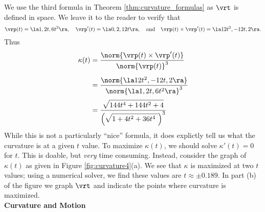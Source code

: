 {We use the third formula in Theorem \ref{thm:curvature_formulas} as $\vrt$ is defined in space. We leave it to the reader to verify that 
$$\vrp(t) =\la 1,2t,6t^2\ra,\quad \vrp'(t) = \la 0,2,12t\ra,\quad \text{and}\quad \vrp(t)\times \vrp'(t) = \la 12t^2,-12t,2\ra.$$
Thus 
\begin{align*}
\kappa(t) &= \frac{\norm{\vrp(t)\times\vrp'(t)}}{\norm{\vrp(t)}^3} \\
				&= \rule{0pt}{20pt}\frac{\norm{\la 12t^2,-12t,2\ra}}{\norm{\la 1,2t,6t^2\ra}^3} \\
				&= \rule{0pt}{20pt}\frac{\sqrt{\rule{0pt}{8.5pt}144t^4+144t^2+4}}{\left(\sqrt{\rule{0pt}{8.5pt}1+4t^2+36t^4\ }\right)^3}
\end{align*}
While this is not a particularly ``nice'' formula, it does explictly tell us what the curvature is at a given $t$ value. To maximize $\kappa(t)$, we should solve $\kappa'(t)=0$ for $t$. This is doable, but \emph{very} time consuming. Instead, consider the graph of $\kappa(t)$ as given in Figure \ref{fig:curvature4}(a). We see that $\kappa$ is maximized at two $t$ values; using a numerical solver, we find these values are $t\approx\pm 0.189$. In part (b) of the figure we graph $\vrt$ and indicate the points where curvature is maximized.
}\\

\noindent\textbf{\large Curvature and Motion}\\

